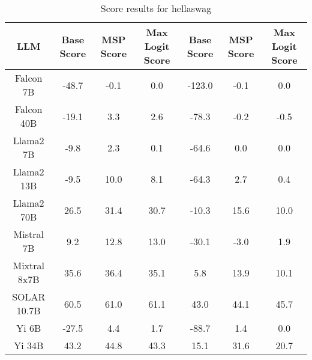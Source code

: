 \renewcommand\arraystretch{1.2}
\begin{table*}
\centering
\begin{tabular}{c|c|c|c|c|c|c}
LLM & Base Score & MSP Score & Max Logit Score & Base Score & MSP Score & Max Logit Score\\ \hline
Falcon 7B & -48.7 & -0.1 & 0.0 & -123.0 & -0.1 & 0.0\\
Falcon 40B & -19.1 & 3.3 & 2.6 & -78.3 & -0.2 & -0.5\\
Llama2 7B & -9.8 & 2.3 & 0.1 & -64.6 & 0.0 & 0.0\\
Llama2 13B & -9.5 & 10.0 & 8.1 & -64.3 & 2.7 & 0.4\\
Llama2 70B & 26.5 & 31.4 & 30.7 & -10.3 & 15.6 & 10.0\\
Mistral 7B & 9.2 & 12.8 & 13.0 & -30.1 & -3.0 & 1.9\\
Mixtral 8x7B & 35.6 & 36.4 & 35.1 & 5.8 & 13.9 & 10.1\\
SOLAR 10.7B & 60.5 & 61.0 & 61.1 & 43.0 & 44.1 & 45.7\\
Yi 6B & -27.5 & 4.4 & 1.7 & -88.7 & 1.4 & 0.0\\
Yi 34B & 43.2 & 44.8 & 43.3 & 15.1 & 31.6 & 20.7\\
\hline
\end{tabular}
\caption{Score results for hellaswag}
\end{table*}
\label{tab:hellaswag_score}

